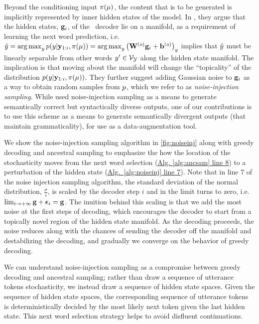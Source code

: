 Beyond the conditioning input $\pi(\mu)$, the content that is to be generated
is implicitly represented by inner hidden states of the model.  In
\citet{cho2016}, they argue that the hidden states, $\mathbf{g}_i$, of the
\sequencetosequence~decoder lie on a manifold, as a requirement of learning the
next word prediction, i.e.  $\hat{y} = \operatorname*{arg\,max}_y
p(y|\mathbf{y}_{1:i},\pi(\mu)) = \operatorname*{arg\,max}_y \left(\mathbf{W}^{(o)}
\mathbf{g}_i + \mathbf{b}^{(o)}\right)_y$ implies that $\hat{y}$ must be
linearly separable from other words $y^\prime \in \mathcal{V}_{\mathcal{Y}}$ along the
hidden state manifold. The implication is that moving about the manifold will
change the ``topicality'' of the distribution
$p(y|\mathbf{y}_{1:i},\pi(\mu))$.  They further suggest adding Gaussian
noise to $\mathbf{g}_i$ as a way to obtain random samples from $p$, which
we refer to as \textit{noise-injection sampling}.  While \citet{cho2016} used
noise-injection sampling as a means to generate semantically correct but
syntactically diverse outputs, one of our contributions is to use this scheme
as a means to generate semantically divergent outputs (that maintain
grammaticality), for use as a data-augmentation tool.





We show the noise-injection sampling algorithm in \autoref{fig:noiseinj} along
with greedy decoding and ancestral sampling to emphasize the how the location
of the stochasticity moves from the next word selection
(\hyperref[fig:noiseinj]{Alg. \ref{alg:ancsam} line 8}) to a perturbation of
the hidden state (\hyperref[fig:noiseinj]{Alg.~\ref{alg:noiseinj} line 7}).
Note that in line 7 of the noise injection sampling algorithm, the standard
deviation of the normal distribution, $\frac{\sigma}{i}$, is scaled by the
decoder step $i$ and in the limit turns to zero, i.e. $\lim_{i \rightarrow
+\infty} \mathbf{g} + \boldsymbol{\epsilon}_i = \mathbf{g}$. The inuition
behind this scaling is that we add the most noise at the first steps of
decoding, which encourages the decoder to start from a topically novel region
of the hidden state manifold. As the decoding proceeds, the noise reduces along
with the chances of sending the decoder off the manifold and destabilizing the
decoding, and gradually we converge on the behavior of greedy decoding. 

We can understand noise-injection sampling as a compromise between greedy
decoding and ancestral sampling; rather than draw a sequence of utterance
tokens stochasticity, we instead draw a sequence of hidden state spaces.  Given
the sequence of hidden state spaces, the corresponding sequence of utterance
tokens is deterministically decided by the most likely next token given the
last hidden state. This next word selection strategy helps to avoid disfluent
continuations.

